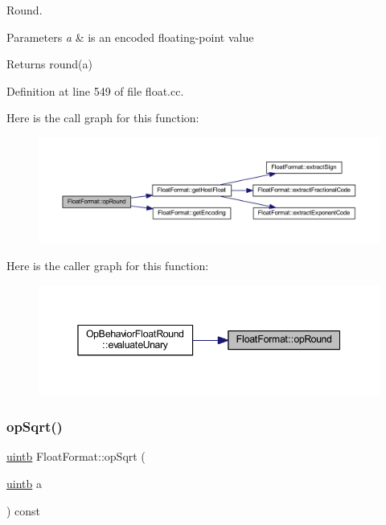 Round. 


\begin{DoxyParams}{Parameters}
{\em a} & is an encoded floating-\/point value \\
\hline
\end{DoxyParams}
\begin{DoxyReturn}{Returns}
round(a) 
\end{DoxyReturn}


Definition at line 549 of file float.\+cc.

Here is the call graph for this function\+:
\nopagebreak
\begin{figure}[H]
\begin{center}
\leavevmode
\includegraphics[width=350pt]{class_float_format_adde6362a78f0ad6cd66fdd04c71032cf_cgraph}
\end{center}
\end{figure}
Here is the caller graph for this function\+:
\nopagebreak
\begin{figure}[H]
\begin{center}
\leavevmode
\includegraphics[width=345pt]{class_float_format_adde6362a78f0ad6cd66fdd04c71032cf_icgraph}
\end{center}
\end{figure}
\mbox{\label{class_float_format_a13cc7817eee998adc9699333cb8f144d}} 
\subsubsection{\texorpdfstring{opSqrt()}{opSqrt()}}
{\footnotesize\ttfamily \mbox{\hyperlink{types_8h_a2db313c5d32a12b01d26ac9b3bca178f}{uintb}} Float\+Format\+::op\+Sqrt (\begin{DoxyParamCaption}\item[{\mbox{\hyperlink{types_8h_a2db313c5d32a12b01d26ac9b3bca178f}{uintb}}}]{a }\end{DoxyParamCaption}) const}



